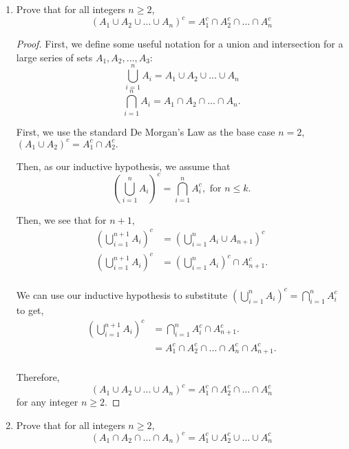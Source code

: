 \documentclass{article}
\begin{document}
\begin{enumerate}
    \item {
        Prove that for all integers \(n \ge 2\), 
        \[\left( A_1 \cup A_2 \cup ... \cup A_n \right)^c = A_1^c \cap A_2^c \cap ... \cap A_n^c \]

        \begin{proof}
            First, we define some useful notation for a union and intersection
            for a large series of sets \(A_1, A_2, ..., A_3\):
            \[ \bigcup_{i=1}^{n} A_i = A_1 \cup A_2 \cup ... \cup A_n\]
            \[ \bigcap_{i=1}^{n} A_i = A_1 \cap A_2 \cap ... \cap A_n.\]

            First, we use the standard De Morgan's Law as the base case \(n=2\),
            \(\left( A_1 \cup A_2 \right)^c = A_1^c \cap A_2^c.\)

            Then, as our inductive hypothesis, we assume that 
            \[ \left( \bigcup_{i=1}^{n} A_i \right)^c = \bigcap_{i=1}^{n} A_i^c, \text{ for } n \le k.\]

            Then, we see that for \(n+1\), 
            \begin{align*}
                \left( \bigcup_{i=1}^{n+1} A_i \right)^c &= \left( \bigcup_{i=1}^{n} A_i \cup A_{n+1} \right)^c \\
                \left( \bigcup_{i=1}^{n+1} A_i \right)^c &= \left( \bigcup_{i=1}^{n} A_i \right)^c \cap A_{n+1}^c .\\
            \end{align*}

            We can use our inductive hypothesis to substitute 
            \(\left( \bigcup_{i=1}^{n} A_i \right)^c = \bigcap_{i=1}^{n} A_i^c\)
            to get,
            \begin{align*}
                \left( \bigcup_{i=1}^{n+1} A_i \right)^c &= \bigcap_{i=1}^{n} A_i^c \cap A_{n+1}^c .\\
                &= A_1^c \cap A_2^c \cap ... \cap A_n^c \cap A_{n+1}^c .\\
            \end{align*}

            Therefore, 
            \[\left( A_1 \cup A_2 \cup ... \cup A_n \right)^c = A_1^c \cap A_2^c \cap ... \cap A_n^c \]
            for any integer \(n \ge 2\).
        \end{proof}
    }

    \item {
        Prove that for all integers \(n \ge 2\), 
        \[\left( A_1 \cap A_2 \cap ... \cap A_n \right)^c = A_1^c \cup A_2^c \cup ... \cup A_n^c \]

}
\end{enumerate}
\end{document}
